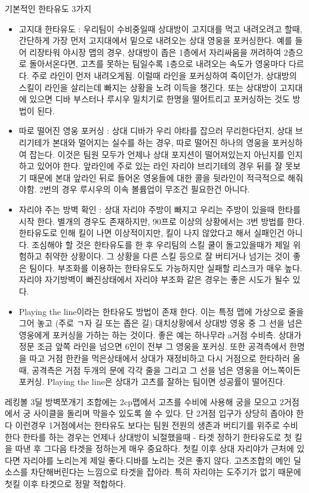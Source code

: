 기본적인 한타유도 3가지
\begin{itemize}
    \item 고지대 한타유도 : 우리팀이 수비중일때 상대방이 고지대를 먹고 내려오려고 할때, 간단하게 가장 먼저 고지대에서 밑으로 내려오는 상대 영웅을 포커싱한다. 예를 들어 리장타워 야시장 맵의 경우, 상대방이 좁은 1층에서 자리싸움을 꺼려하여 2층으로 돌아서온다면, 고츠를 못하는 팀일수록 1층으로 내려오는 속도가 영웅마다 다르다. 주로 라인이 먼저 내려오게됨. 이럴때 라인을 포커싱하여 죽이던가, 상대방의 스킬이 라인을 살리는데 빠지는 상황을 노려 이득을 챙긴다. 또는 상대방이 고지대에 있으면 디바 부스터나 루시우 밀치기로 한명을 떨어트리고 포커싱하는 것도 방법이 된다.
    \item 따로 떨어진 영웅 포커싱 : 상대 디바가 우리 야타를 잡으러 무리한다던지, 상대 브리기테가 본대와 멀어지는 실수를 하는 경우, 따로 떨어진 하나의 영웅을 포커싱하여 잡는다. 이것은 팀원 모두가 언제나 상대 포지션이 떨어져있는지 아닌지를 인지하고 있어야 한다. 앞라인에 주로 있는 라인 자리야 브리기테의 경우 뒤를 잘 못보기 때문에 본대 앞라인 뒤로 들어온 영웅들에 대한 콜을 뒷라인이 적극적으로 해줘야함. 2번의 경우 루시우의 이속 볼륨업이 무조건 필요한건 아니다.
    \item 자리야 주는 방벽 확인 : 상대 자리야 주방이 빠지고 우리는 주방이 있을때 한타를 시작 한다. 별개의 경우도 존재하지만, 90프로 이상의 상황에서는 3번 방법를 한다. 한타유도로 인해 킬이 나면 이상적이지만, 킬이 나지 않았다고 해서 실패인건 아니다. 조심해야 할 것은 한타유도를 한 후 우리팀의 스킬 쿨이 돌고있을때가 제일 위험하고 취약한 상황이다. 그 상황을 다른 스킬 등으로 잘 버티거나 넘기는 것이 좋은 팀이다. 부조화를 이용하는 한타유도도 가능하지만 실패할 리스크가 매우 높다. 자리야 자기방벽이 빠진상태에서 자리야 부조화 같은 경우는 좋은 시도가 될수 있다.
    \item Playing the line이라는 한타유도 방법이 존재 한다. 이는 특정 맵에 가상으로 줄을 그어 놓고 (주로 ㄱ자 길 또는 좁은 길)
대치상황에서 상대방 영웅 중 그 선을 넘은 영웅에게 포커싱을 가하는 하는 것이다.
좋은 예는 하나무라 a거점 수비측. 상대가 정문 조금 앞쪽 라인을 넘으면 6인이 전부 그 영웅을 포커싱.
또한 공격측에서 한명을 따고 거점 한칸을 먹은상태에서 상대가 재정비하고 다시 거점으로 한타하러 올때, 
공격측은 거점 두개의 문에 각각 줄을 그리고 그 선을 넘은 영웅을 어느쪽이든 포커싱.
Playing the line은 상대가 고츠를 잘하는 팀이면 성공률이 떨어진다.


\end{itemize}



레킹볼 3딜 방벽쪼개기 조합에는 2cp맵에서 고츠를 수비에 사용해 궁을 모으고 2거점에서 궁 사이클을 돌리며 막을수 있도록 쓸 수 있다. 단 2거점 입구가 상당히 좁아야 한다
이런경우 1거점에서는 한타유도 보다는 팀원 전원의 생존과 버티기를 위주로 수비한다
한타를 하는 경우는 언제나 상대방이 뇌절했을때
 - 타겟 정하기
한타유도로 첫 킬을 따낸 후 그다음 타겟을 정하는게 매우 중요하다.
첫킬 이후 상대 자리야가 근처에 있다면 자리야를 노리는게 제일 좋다.디바를 노리는 것은 좋지 않다. 고츠조합의 메인 딜 소스를 차단해버린다는 느낌으로 타겟을 잡아라.
특히 자리야는 도주기가 없기 때문에 첫킬 이후 타겟으로 정말 적합하다.

